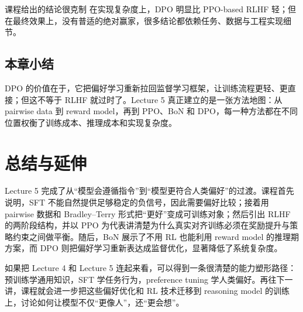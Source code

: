 \documentclass[a4paper]{article}
\begin{document}
\begin{knowledgebox}{课程给出的结论很克制}
在实现复杂度上，DPO 明显比 PPO-based RLHF 轻；但在最终效果上，没有普适的绝对赢家，很多结论都依赖任务、数据与工程实现细节。
\end{knowledgebox}

\subsection{本章小结}
DPO 的价值在于，它把偏好学习重新拉回监督学习框架，让训练流程更轻、更直接；但这不等于 RLHF 就过时了。Lecture 5 真正建立的是一张方法地图：从 pairwise data 到 reward model，再到 PPO、BoN 和 DPO，每一种方法都在不同位置权衡了训练成本、推理成本和实现复杂度。

\section{总结与延伸}
Lecture 5 完成了从“模型会遵循指令”到“模型更符合人类偏好”的过渡。课程首先说明，SFT 不能自然提供足够稳定的负信号，因此需要偏好比较；接着用 pairwise 数据和 Bradley--Terry 形式把“更好”变成可训练对象；然后引出 RLHF 的两阶段结构，并以 PPO 为代表讲清楚为什么真实对齐训练必须在奖励提升与策略约束之间做平衡。随后，BoN 展示了不用 RL 也能利用 reward model 的推理期方案，而 DPO 则把偏好学习重新表达成监督优化，显著降低了系统复杂度。

如果把 Lecture 4 和 Lecture 5 连起来看，可以得到一条很清楚的能力塑形路径：预训练学通用知识，SFT 学任务行为，preference tuning 学人类偏好。再往下一讲，课程就会进一步把这些偏好优化和 RL 技术迁移到 reasoning model 的训练上，讨论如何让模型不仅“更像人”，还“更会想”。 
\end{document}
